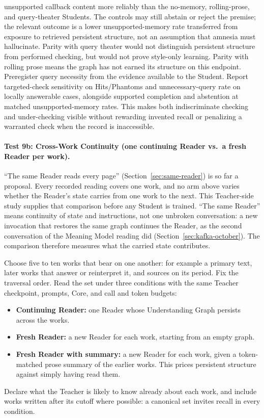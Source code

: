 \documentclass[11pt]{article}
\begin{document}
unsupported callback content more reliably than the no-memory, rolling-prose,
and query-theater Students. The controls may still abstain or reject the premise;
the relevant outcome is a
lower unsupported-memory rate transferred from exposure to retrieved persistent
structure, not an assumption that amnesia must hallucinate. Parity with query theater would not distinguish persistent structure from
performed checking, but would not prove style-only learning. Parity with
rolling prose means the graph has not earned its structure on this endpoint.
Preregister query necessity from the evidence available to the Student.
Report targeted-check sensitivity on Hits/Phantoms and unnecessary-query rate
on locally answerable cases, alongside supported completion and abstention at
matched unsupported-memory rates. This makes both indiscriminate checking and
under-checking visible without rewarding invented recall or penalizing a
warranted check when the record is inaccessible.

\paragraph{Test 9b: Cross-Work Continuity (one continuing Reader vs.\ a fresh Reader per work).}
\label{sec:cross-work-test}
\enquote{The same Reader reads every page} (Section~\ref{sec:same-reader}) is
so far a proposal. Every recorded reading covers one work, and no arm above
varies whether the Reader's state carries from one work to the next. This
Teacher-side study supplies that comparison before any Student is trained.
\enquote{The same Reader} means continuity of state and instructions, not one
unbroken conversation: a new invocation that restores the same graph continues
the Reader, as the second conversation of the Meaning Model reading did
(Section~\ref{sec:kafka-october}). The comparison therefore measures what the
carried state contributes.

Choose five to ten works that bear on one another: for example a primary text,
later works that answer or reinterpret it, and sources on its period. Fix the
traversal order. Read the set under three conditions with the same Teacher
checkpoint, prompts, Core, and call and token budgets:
\begin{itemize}[leftmargin=*]
    \item \textbf{Continuing Reader:} one Reader whose Understanding Graph
    persists across the works.
    \item \textbf{Fresh Reader:} a new Reader for each work, starting from an
    empty graph.
    \item \textbf{Fresh Reader with summary:} a new Reader for each work, given
    a token-matched prose summary of the earlier works. This prices persistent
    structure against simply having read them.
\end{itemize}
Declare what the Teacher is likely to know already about each work, and
include works written after its cutoff where possible: a canonical set invites
recall in every condition.
\end{document}
